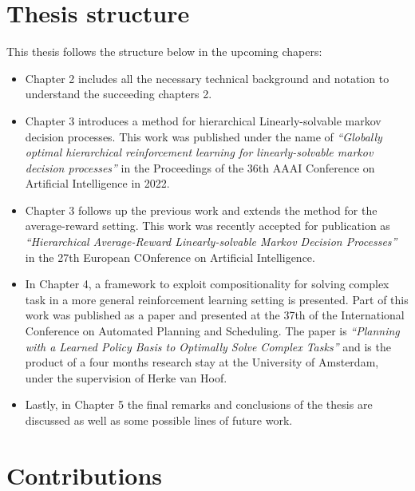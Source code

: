 \section{Thesis structure}

This thesis follows the structure below in the upcoming chapers:
\begin{itemize}
    \item Chapter 2 includes all the necessary technical background and notation to understand the succeeding chapters 2.  
    \item Chapter 3 introduces a method for hierarchical Linearly-solvable markov decision processes. This work was published under the name of \textit{``Globally optimal hierarchical reinforcement learning for linearly-solvable markov decision processes''} in the Proceedings of the 36th AAAI Conference on Artificial Intelligence in 2022.
    \item Chapter 3 follows up the previous work and extends the method for the average-reward setting. This work was recently accepted for publication as \textit{``Hierarchical Average-Reward Linearly-solvable Markov Decision Processes''} in the 27th European COnference on Artificial Intelligence.
    \item In Chapter 4, a framework to exploit compositionality for solving complex task in a more general reinforcement learning setting is presented. Part of this work was published as a paper and presented at the 37th of the International Conference on Automated Planning and Scheduling. The paper is \textit{``Planning with a Learned Policy Basis to Optimally Solve Complex Tasks''} and is the product of a four months research stay at the University of Amsterdam, under the supervision of Herke van Hoof.
    \item Lastly, in Chapter 5 the final remarks and conclusions of the thesis are discussed as well as some possible lines of future work.
\end{itemize}

\section{Contributions}